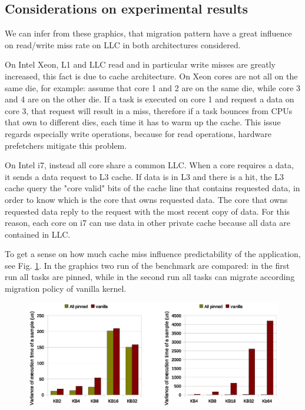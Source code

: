 \newpage
\subsection{Considerations on experimental results}

We can infer from these graphics, that migration pattern have a great influence on read/write miss rate on LLC in both architectures considered. 

On Intel Xeon, L1 and LLC read and in particular write misses are greatly increased, this fact is due to cache architecture. On Xeon cores are not all on 
the same die, for example: assume that core 1 and 2 are on the same die, while core 3 and 4 are on the other die. If a task is executed on core 1 and 
request a data on core 3, that request will result in a miss, therefore if a task bounces from CPUs that own to different dies, each time it has to warm 
up the cache. This issue regards especially write operations, because for read operations, hardware prefetchers mitigate this problem.

On Intel i7, instead all core share a common LLC. When a core requires a data, it sends a data request to L3 cache. If data is in L3 and there is a hit, 
the L3 cache query the "core valid" bits of the cache line that contains requested data, in order to know which is the core that owns requested data. The 
core that owns requested data reply to the request with the most recent copy of data. For this reason, each core on i7 can use data in other private cache
because all data are contained in LLC.

To get a sense on how much cache miss influence predictability of the application, see Fig. \ref{fig:time_cpf_var_Xeon_i7}. In the graphics two run of the
benchmark are compared: in the first run all tasks are pinned, while in the second run all tasks can migrate according migration policy of vanilla kernel.

\begin{figure}[htbp]
\centering
\includegraphics[width=\widefigure]{images/cpf_time/time_cpf_var_Xeon_i7.eps}
\caption{}
\label{fig:time_cpf_var_Xeon_i7}
\end{figure}

